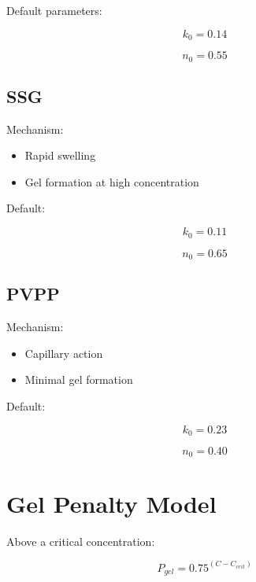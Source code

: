 \documentclass[11pt]{article}
\begin{document}
Default parameters:

\begin{equation}
k_0=0.14
\end{equation}

\begin{equation}
n_0=0.55
\end{equation}

\subsection{SSG}

Mechanism:

\begin{itemize}
\item Rapid swelling
\item Gel formation at high concentration
\end{itemize}

Default:

\begin{equation}
k_0=0.11
\end{equation}

\begin{equation}
n_0=0.65
\end{equation}

\subsection{PVPP}

Mechanism:

\begin{itemize}
\item Capillary action
\item Minimal gel formation
\end{itemize}

Default:

\begin{equation}
k_0=0.23
\end{equation}

\begin{equation}
n_0=0.40
\end{equation}

\section{Gel Penalty Model}

Above a critical concentration:

\begin{equation}
P_{gel}
=
0.75^{(C-C_{crit})}
\end{equation}
\end{document}
